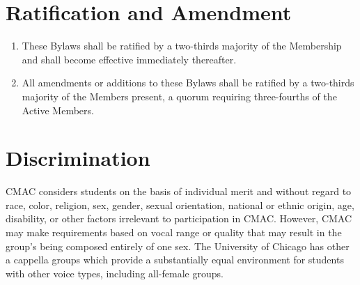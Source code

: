 \documentclass{article}
\begin{document}
\section{Ratification and Amendment}
\begin{enumerate}
\item These Bylaws shall be ratified by a two-thirds majority of the Membership
  and shall become effective immediately thereafter.
\item All amendments or additions to these Bylaws shall be ratified by a
  two-thirds majority of the Members present, a quorum requiring three-fourths
  of the Active Members.
\end{enumerate}

\section{Discrimination}

CMAC considers students on the basis of individual merit and without regard to
race, color, religion, sex, gender, sexual orientation, national or ethnic
origin, age, disability, or other factors irrelevant to participation in
CMAC. However, CMAC may make requirements based on vocal range or quality that
may result in the group's being composed entirely of one sex. The University of
Chicago has other a cappella groups which provide a substantially equal
environment for students with other voice types, including all-female groups.
\end{document}
